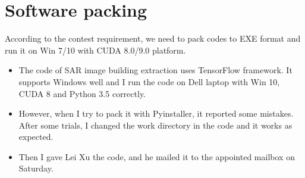 \documentclass[]{IEEEtran}
\begin{document}
\section{Software packing}
	According to the contest requirement, we need to pack codes to EXE format and run it on Win 7/10 with CUDA 8.0/9.0 platform.
	\begin{itemize}
		\item The code of SAR image building extraction uses TensorFlow framework. It supports Windows well and I run the code on Dell laptop with Win 10, CUDA 8 and Python 3.5 correctly.
		\item However, when I try to pack it with Pyinstaller, it reported some mistakes. After some trials, I changed the work directory in the code and it works as expected.
		\item Then I gave Lei Xu the code, and he mailed it to the appointed mailbox on Saturday.
	\end{itemize}
\newpage
\end{document}
